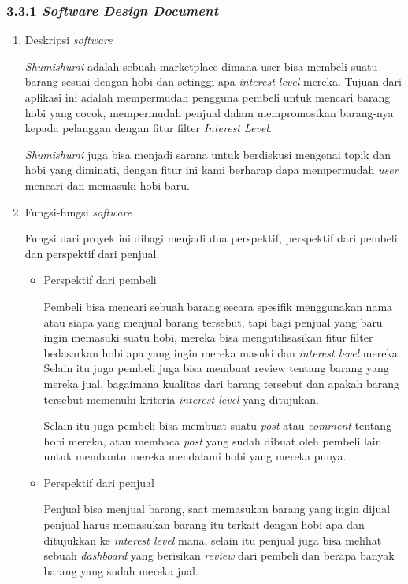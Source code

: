 \documentclass[a4paper]{article}
\begin{document}
\subsubsection*{3.3.1 \textit{Software Design Document}}
\begin{enumerate}[label=\alph*. ]
    \item Deskripsi \textit{software}

          \textit{Shumishumi} adalah sebuah marketplace dimana user bisa membeli suatu barang sesuai dengan hobi dan setinggi apa \textit{interest level} mereka. Tujuan dari aplikasi ini adalah mempermudah pengguna pembeli untuk mencari barang hobi yang cocok, mempermudah penjual dalam mempromosikan barang-nya kepada pelanggan dengan fitur filter \textit{Interest Level}.


          \textit{Shumishumi} juga bisa menjadi sarana untuk berdiskusi mengenai topik dan hobi yang diminati, dengan fitur ini kami berharap dapa mempermudah \textit{user} mencari dan memasuki hobi baru.

    \item Fungsi-fungsi \textit{software}


          Fungsi dari proyek ini dibagi menjadi dua perspektif, perspektif dari pembeli dan perspektif dari penjual.
          \begin{itemize}
              \item Perspektif dari pembeli

                    Pembeli bisa mencari sebuah barang secara spesifik menggunakan nama atau siapa yang menjual barang tersebut, tapi bagi penjual yang baru ingin memasuki suatu hobi, mereka bisa mengutilisasikan fitur filter bedasarkan hobi apa yang ingin mereka masuki dan \textit{interest level} mereka. Selain itu juga pembeli juga bisa membuat review tentang barang yang mereka jual, bagaimana kualitas dari barang tersebut dan apakah barang tersebut memenuhi kriteria \textit{interest level} yang ditujukan.

                    Selain itu juga pembeli bisa membuat suatu \textit{post} atau \textit{comment} tentang hobi mereka, atau membaca \textit{post} yang sudah dibuat oleh pembeli lain untuk membantu mereka mendalami hobi yang mereka punya.

              \item Perspektif dari penjual

                    Penjual bisa menjual barang, saat memasukan barang yang ingin dijual penjual harus memasukan barang itu terkait dengan hobi apa dan ditujukkan ke \textit{interest level} mana, selain itu penjual juga bisa melihat sebuah \textit{dashboard} yang berisikan \textit{review} dari pembeli dan berapa banyak barang yang sudah mereka jual.
          \end{itemize}


\end{enumerate}
\end{document}
